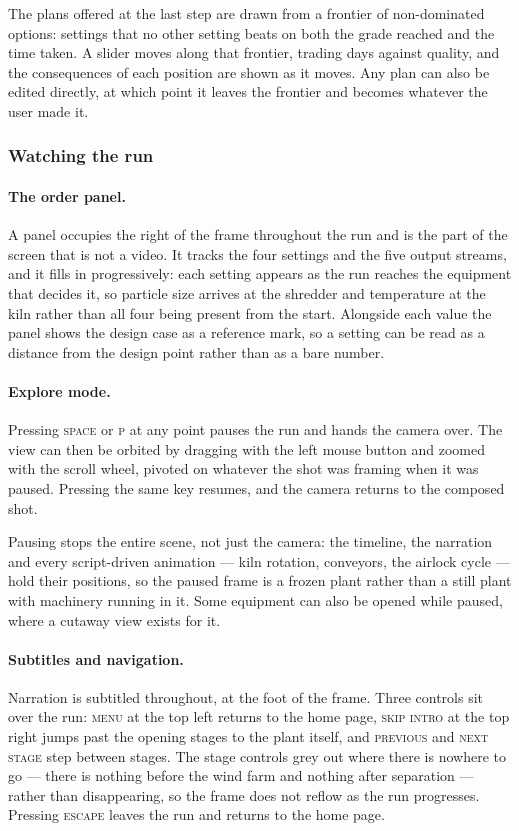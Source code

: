 The plans offered at the last step are drawn from a frontier of non-dominated options: settings that no other setting beats on both the grade reached and the time taken. A slider moves along that frontier, trading days against quality, and the consequences of each position are shown as it moves. Any plan can also be edited directly, at which point it leaves the frontier and becomes whatever the user made it.

\subsubsection{Watching the run}

\paragraph{The order panel.}
A panel occupies the right of the frame throughout the run and is the part of the screen that is not a video. It tracks the four settings and the five output streams, and it fills in progressively: each setting appears as the run reaches the equipment that decides it, so particle size arrives at the shredder and temperature at the kiln rather than all four being present from the start. Alongside each value the panel shows the design case as a reference mark, so a setting can be read as a distance from the design point rather than as a bare number.

\paragraph{Explore mode.}
Pressing \textsc{space} or \textsc{p} at any point pauses the run and hands the camera over. The view can then be orbited by dragging with the left mouse button and zoomed with the scroll wheel, pivoted on whatever the shot was framing when it was paused. Pressing the same key resumes, and the camera returns to the composed shot.

Pausing stops the entire scene, not just the camera: the timeline, the narration and every script-driven animation --- kiln rotation, conveyors, the airlock cycle --- hold their positions, so the paused frame is a frozen plant rather than a still plant with machinery running in it. Some equipment can also be opened while paused, where a cutaway view exists for it.

\paragraph{Subtitles and navigation.}
Narration is subtitled throughout, at the foot of the frame. Three controls sit over the run: \textsc{menu} at the top left returns to the home page, \textsc{skip intro} at the top right jumps past the opening stages to the plant itself, and \textsc{previous} and \textsc{next stage} step between stages. The stage controls grey out where there is nowhere to go --- there is nothing before the wind farm and nothing after separation --- rather than disappearing, so the frame does not reflow as the run progresses. Pressing \textsc{escape} leaves the
run and returns to the home page.

